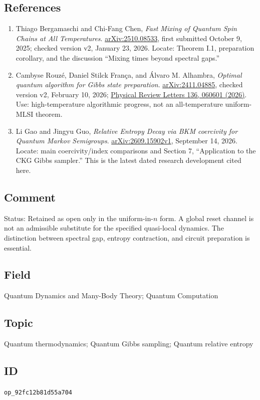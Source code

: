 \subsection*{References}

\begin{enumerate}[label={},leftmargin=4.8em,labelsep=0.5em]
  \footnotesize
  \item[\textup{[Bergamaschi25]}]\label{ref:92fc-bergamaschi25}
  Thiago Bergamaschi and Chi-Fang Chen, \emph{Fast Mixing of Quantum Spin Chains at All Temperatures}. \href{https://arxiv.org/abs/2510.08533}{arXiv:2510.08533}, first submitted October 9, 2025; checked version v2, January 23, 2026. Locate: Theorem I.1, preparation corollary, and the discussion “Mixing times beyond spectral gaps.”

  \item[\textup{[Rouz26]}]\label{ref:92fc-rouz26}
  Cambyse Rouzé, Daniel Stilck França, and Álvaro M. Alhambra, \emph{Optimal quantum algorithm for Gibbs state preparation}. \href{https://arxiv.org/abs/2411.04885}{arXiv:2411.04885}, checked version v2, February 10, 2026; \href{https://doi.org/10.1103/lhht-svmn}{Physical Review Letters 136, 060601 (2026)}. Use: high-temperature algorithmic progress, not an all-temperature uniform-MLSI theorem.

  \item[\textup{[Gao26]}]\label{ref:92fc-gao26}
  Li Gao and Jingyu Guo, \emph{Relative Entropy Decay via BKM coercivity for Quantum Markov Semigroups}. \href{https://arxiv.org/abs/2609.15902v1}{arXiv:2609.15902v1}, September 14, 2026. Locate: main coercivity/index comparisons and Section 7, “Application to the CKG Gibbs sampler.” This is the latest dated research development cited here.
\end{enumerate}

\subsection*{Comment}

Status: Retained as open only in the uniform-in-$n$ form. A global reset channel is not an admissible substitute for the specified quasi-local dynamics. The distinction between spectral gap, entropy contraction, and circuit preparation is essential.

\subsection*{Field}

Quantum Dynamics and Many-Body Theory; Quantum Computation

\subsection*{Topic}

Quantum thermodynamics; Quantum Gibbs sampling; Quantum relative entropy

\subsection*{ID}

\texttt{op\_92fc12b81d55a704}
